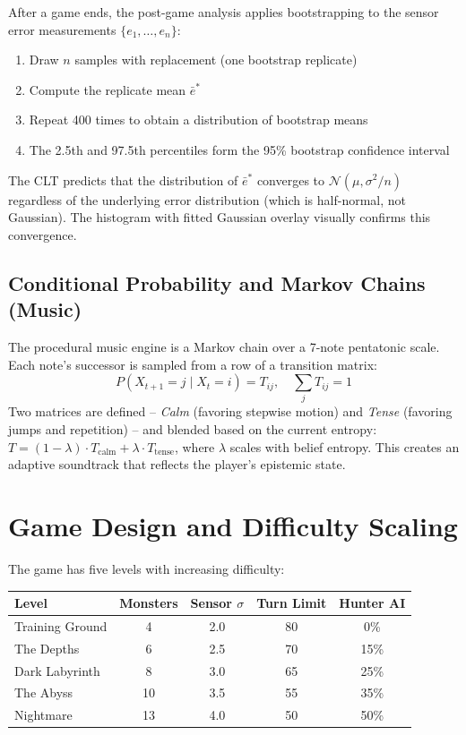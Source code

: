 \documentclass[11pt]{article}
\begin{document}
After a game ends, the post-game analysis applies bootstrapping to the sensor error measurements $\{e_1, \ldots, e_n\}$:
\begin{enumerate}[nosep]
    \item Draw $n$ samples with replacement (one bootstrap replicate)
    \item Compute the replicate mean $\bar{e}^*$
    \item Repeat 400 times to obtain a distribution of bootstrap means
    \item The 2.5th and 97.5th percentiles form the 95\% bootstrap confidence interval
\end{enumerate}
The CLT predicts that the distribution of $\bar{e}^*$ converges to $\mathcal{N}(\mu, \sigma^2/n)$ regardless of the underlying error distribution (which is half-normal, not Gaussian). The histogram with fitted Gaussian overlay visually confirms this convergence.

\subsection{Conditional Probability and Markov Chains (Music)}

The procedural music engine is a Markov chain over a 7-note pentatonic scale. Each note's successor is sampled from a row of a transition matrix:
\[
P(X_{t+1} = j \mid X_t = i) = T_{ij}, \quad \sum_j T_{ij} = 1
\]
Two matrices are defined -- \textit{Calm} (favoring stepwise motion) and \textit{Tense} (favoring jumps and repetition) -- and blended based on the current entropy: $T = (1 - \lambda) \cdot T_{\text{calm}} + \lambda \cdot T_{\text{tense}}$, where $\lambda$ scales with belief entropy. This creates an adaptive soundtrack that reflects the player's epistemic state.

\section{Game Design and Difficulty Scaling}

The game has five levels with increasing difficulty:

\begin{center}
\begin{tabular}{lcccc}
\toprule
\textbf{Level} & \textbf{Monsters} & \textbf{Sensor $\sigma$} & \textbf{Turn Limit} & \textbf{Hunter AI} \\
\midrule
Training Ground & 4 & 2.0 & 80 & 0\% \\
The Depths & 6 & 2.5 & 70 & 15\% \\
Dark Labyrinth & 8 & 3.0 & 65 & 25\% \\
The Abyss & 10 & 3.5 & 55 & 35\% \\
Nightmare & 13 & 4.0 & 50 & 50\% \\
\bottomrule
\end{tabular}
\end{center}
\end{document}

